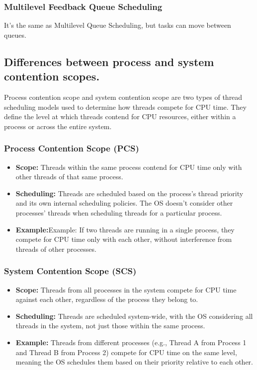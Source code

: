 \documentclass{article}
\begin{document}
\subsubsection{Multilevel Feedback Queue Scheduling}

It's the same as Multilevel Queue Scheduling, but tasks can move between queues. 



\subsection{Differences between process and system contention scopes.} %

Process contention scope and system contention scope are two types of thread scheduling models used to determine 
how threads compete for CPU time. They define the level at which threads contend for CPU 
resources, either within a process or across the entire system.



\subsubsection{Process Contention Scope (PCS)}

\begin{itemize}
    \item {\bf Scope:} Threads within the same process contend for CPU time only with other threads of that same process.
    \item {\bf Scheduling:} Threads are scheduled based on the process's thread priority and its own internal scheduling policies. The OS doesn't consider other processes' threads when scheduling threads for a particular process.
    \item {\bf Example:}Example: If two threads are running in a single process, they compete for CPU time only with each other, without interference from threads of other processes.
\end{itemize}


\subsubsection{System Contention Scope (SCS)}

\begin{itemize}
    \item {\bf Scope:} Threads from all processes in the system compete for CPU time against each other, regardless of the process they belong to.
    \item {\bf Scheduling:} Threads are scheduled system-wide, with the OS considering all threads in the system, not just those within the same process.
    \item {\bf Example:} Threads from different processes (e.g., Thread A from Process 1 and Thread B from Process 2) compete for CPU time on the same level, meaning the OS schedules them based on their priority relative to each other.
\end{itemize}
\end{document}
